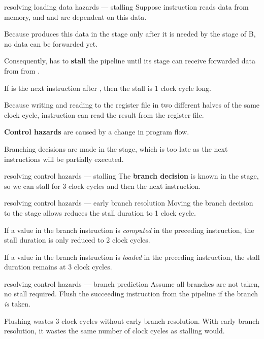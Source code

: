 \begin{defn}{resolving loading data hazards --- stalling}
    Suppose instruction  reads data from memory, and  and  are dependent on
    this data.
    
    Because  produces this data in the  stage only after it is needed by
    the  stage of B, no data can be forwarded yet.

    Consequently,  has to \textbf{stall} the pipeline until its  stage
    can receive forwarded data from  from .

    If  is the next instruction after , then the stall is 1 clock cycle long.

    Because writing and reading to the register file in two different halves of the same clock cycle,
    instruction  can read the result from the register file.
\end{defn}

\textbf{Control hazards} are caused by a change in program flow.

Branching decisions are made in the  stage, which is too late as the next instructions will
be partially executed.

\begin{defn}{resolving control hazards --- stalling}
    The \textbf{branch decision} is known in the  stage, so we can stall for 3 clock cycles
    and then  the next instruction.
\end{defn}

\begin{defn}{resolving control hazards --- early branch resolution}
    Moving the branch decision to the  stage allows reduces the stall duration to 1 clock cycle.

    If a value in the branch instruction is \textit{computed} in the preceding instruction, the stall duration is only
    reduced to 2 clock cycles.

    If a value in the branch instruction is \textit{loaded} in the preceding instruction, the stall duration
    remains at 3 clock cycles.
\end{defn}

\begin{defn}{resolving control hazards --- branch prediction}
    Assume all branches are not taken, no stall required.
    Flush the succeeding instruction from the pipeline if the branch \textit{is} taken.

    Flushing wastes 3 clock cycles without early branch resolution.
    With early branch resolution, it wastes the same number of clock cycles as stalling would.
\end{defn}

